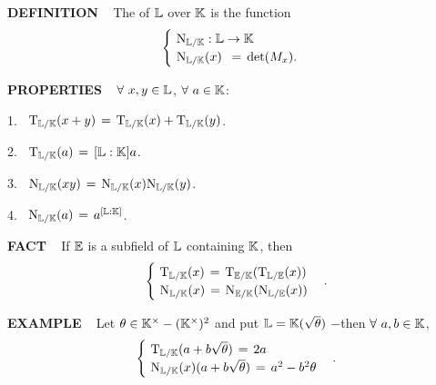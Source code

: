 \vspace{0.1cm}


\begin{x}{\small\bf DEFINITION} \ %
The 
\index{$\tN_{\LL/\K}$}
of $\LL$ over $\K$ is the function 
\[
\begin{cases}
\ \tN_{\LL/\K}:\LL \ra \K\\
\ \tN_{\LL/\K}(x) \ \hsx = \hsx \det(M_x).
\end{cases}
\]
\end{x}

\vspace{0.1cm}

\begin{x}{\small\bf PROPERTIES} \ %
$\forall \ x, y \in \LL$, $\forall \ a \in \K$:

\vspace{0.1cm}

1. \ $\tT_{\LL/\K}(x + y) \hsx = \hsx \tT_{\LL/\K}(x) + \tT_{\LL/\K}(y)$.

\vspace{0.1cm}

2. \ $\tT_{\LL/\K}(a) \hsx = \hsx [\LL:\K] a$.

\vspace{0.1cm}

3. \ $\tN_{\LL/\K}(x y) \hsx = \hsx \tN_{\LL/\K}(x) \tN_{\LL/\K}(y)$.

\vspace{0.1cm}

4. \ $\tN_{\LL/\K}(a) \hsx = \hsx a^{[\LL:\K]}$.
\end{x}

\vspace{0.1cm}


\begin{x}{\small\bf FACT} \ %
If $\E$ is a subfield of $\LL$ containing $\K$, then 
\[
\begin{cases}
\ \tT_{\LL/\K}(x) \hsx = \hsx \tT_{\E/\K} ( \tT_{\LL/\E} (x))\\
\ \tN_{\LL/\K}(x) \hsx = \hsx \tN_{\E/\K} ( \tN_{\LL/\E} (x))
\end{cases}
.
\]
\end{x}

\vspace{0.1cm}

\begin{x}{\small\bf EXAMPLE} \ %
Let $\theta \in \K^\times - (\K^\times)^2$ and put $\LL = \K(\sqrt{\theta})$ $-$then $\forall \ a, b \in \K$, 
\[
\begin{cases}
\ \tT_{\LL/\K}(a + b \sqrt{\theta}) \hsx = \hsx 2a\\
\ \tN_{\LL/\K}(x) (a + b \sqrt{\theta}) \hsx = \hsx a^2 - b^2 \theta
\end{cases}
.
\]
\end{x}








